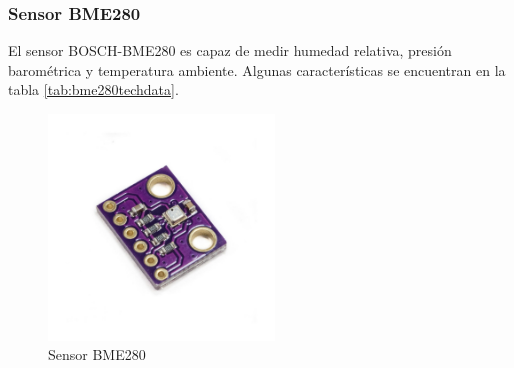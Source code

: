 \documentclass[../main]{subfiles}
\begin{document}
\subsubsection{Sensor BME280}

El sensor BOSCH-BME280 es capaz de medir humedad relativa, presión
barométrica y temperatura ambiente. \supercite{boschbme280descr}
Algunas características se encuentran en la tabla \ref{tab:bme280techdata}.

\begin{figure}[H]
	\centering
	\includegraphics[height=6cm]{res/sensor-bme280-presion-temperatura-y-humedad.jpg}
	\caption{Sensor BME280 \supercite{bme280image}}
	\label{fig:bme280fig}
\end{figure}
\end{document}
